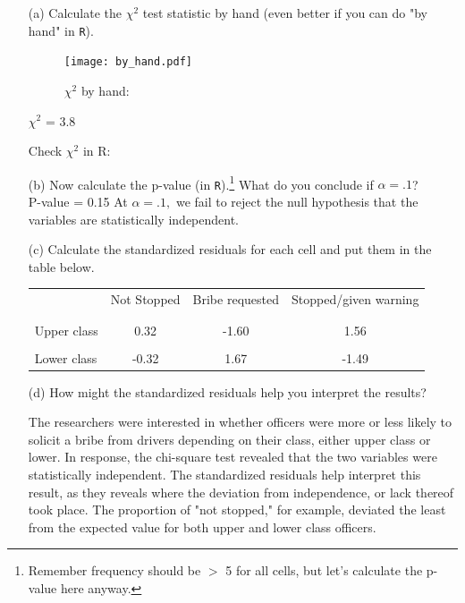 \documentclass[12pt,letterpaper]{article}
\begin{document}
\begin{enumerate}
	
	\item [(a)]
	Calculate the $\chi^2$ test statistic by hand (even better if you can do "by hand" in \texttt{R}).\\
	\newpage
	
	\begin{figure}[h!]\centering
	\caption{\footnotesize $\chi^2$ by hand: }
		\label{fig:plot_2}
	\texttt{[image: by\_hand.pdf]}
		\end{figure}
		
		
	
	$\chi^2$ = 3.8
	
	Check $\chi^2$ in R: 
	  
	
	
	
	\item [(b)]
	Now calculate the p-value (in \texttt{R}).\footnote{Remember frequency should be $>$ 5 for all cells, but let's calculate the p-value here anyway.}  What do you conclude if $\alpha = .1$?\\
	  
	P-value = 0.15
	At $\alpha = .1,$ we fail to reject the null hypothesis that the variables are statistically independent. 
	
	\newpage
	\item [(c)] Calculate the standardized residuals for each cell and put them in the table below.
	  
	
	\begin{table}[h]
		\centering
		\begin{tabular}{l | c c c }
			& Not Stopped & Bribe requested & Stopped/given warning \\
			\\[-1.8ex] 
			\hline \\[-1.8ex]
			Upper class  & 0.32 &  -1.60 &  1.56   \\
			\\
			Lower class & -0.32 & 1.67  &  -1.49   \\
			
		\end{tabular}
	\end{table}
	
	
	\vspace{1cm}
	\item [(d)] How might the standardized residuals help you interpret the results?  
	\vspace{.25cm}
	
	The researchers were interested in whether officers were more or less likely to solicit a bribe from drivers depending on their class, either upper class or lower. In response, the chi-square test revealed that the two variables were statistically independent. The standardized residuals help interpret this result, as they reveals where the deviation from independence, or lack thereof took place. The proportion of "not stopped," for example, deviated the least from the expected value for both upper and lower class officers.
	
\end{enumerate}
\end{document}
